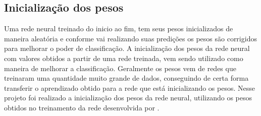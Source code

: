 \subsection{Inicialização dos pesos}
Uma rede neural treinado do inicio ao fim, tem seus pesos inicializados de maneira aleatória e conforme vai realizando suas predições os pesos são corrigidos para melhorar o poder de classificação. A inicialização dos pesos da rede neural com valores obtidos a partir de uma rede treinada, vem sendo utilizado como maneira de melhorar a classificação. 
Geralmente os pesos vem de redes que treinaram uma quantidade muito grande de dados, conseguindo de certa forma transferir o aprendizado obtido para a rede que está inicializando os pesos.
Nesse projeto foi realizado a inicialização dos pesos da rede neural, utilizando os pesos obtidos no treinamento da rede desenvolvida por .






